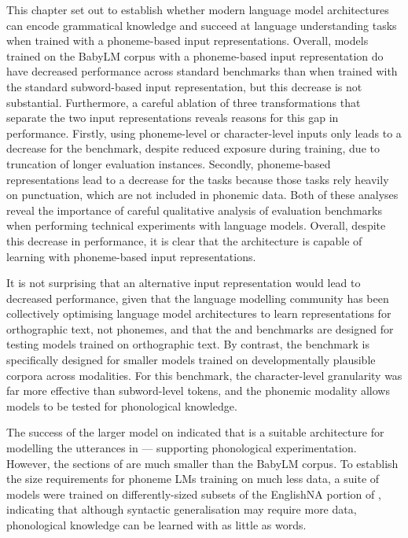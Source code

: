 This chapter set out to establish whether modern language model architectures can encode grammatical knowledge and succeed at language understanding tasks when trained with a phoneme-based input representations. Overall, \gpt models trained on the BabyLM corpus with a phoneme-based input representation do have decreased performance across standard benchmarks than when trained with the standard subword-based input representation, but this decrease is not substantial. Furthermore, a careful ablation of three transformations that separate the two input representations reveals reasons for this gap in performance. Firstly, using phoneme-level or character-level inputs only leads to a decrease for the \glue benchmark, despite reduced exposure during training, due to truncation of longer evaluation instances. Secondly, phoneme-based representations lead to a decrease for the \blimpsupp tasks because those tasks rely heavily on punctuation, which are not included in phonemic data. Both of these analyses reveal the importance of careful qualitative analysis of evaluation benchmarks when performing technical experiments with language models. Overall, despite this decrease in performance, it is clear that the \gpt architecture is capable of learning with phoneme-based input representations.

It is not surprising that an alternative input representation would lead to decreased performance, given that the language modelling community has been collectively optimising language model architectures to learn representations for orthographic text, not phonemes, and that the \blimp and \glue benchmarks are designed for testing models trained on orthographic text. By contrast, the \babyslm benchmark is specifically designed for smaller models trained on developmentally plausible corpora across modalities. For this benchmark, the character-level granularity was far more effective than subword-level tokens, and the phonemic modality allows models to be tested for phonological knowledge.

The success of the larger \gpt model on \babyslm indicated that \gpt is a suitable architecture for modelling the utterances in \ipachildes --- supporting phonological experimentation. However, the sections of \ipachildes are much smaller than the BabyLM corpus. To establish the size requirements for phoneme LMs training on much less data, a suite of models were trained on differently-sized subsets of the EnglishNA portion of \ipachildes, indicating that although syntactic generalisation may require more data, phonological knowledge can be learned with as little as  words. 

